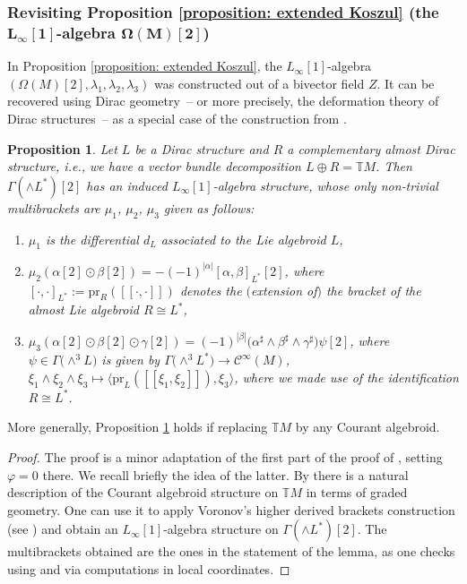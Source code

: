 \documentclass[10pt,a4paper]{amsart}
\numberwithin{equation}{section}
\newtheorem{Proposition}[Theorem]{Proposition}
 { \theoremstyle{definition}
\newtheorem{Definition}[Theorem]{Definition}
\newtheorem{Remark}[Theorem]{Remark} }
\newcommand{\smooth}{\mathcal{C}}
\newcommand{\TT}{\ensuremath{\mathbb T}}
\newcommand{\oo}{[\![}
\newcommand{\cc}{]\!]}
\begin{document}
\subsubsection[Revisiting Proposition \ref{proposition: extended Koszul} (the {$L_\infty[1]$}-algebra {$\Omega(M)[2]$})]{Revisiting Proposition \ref{proposition: extended Koszul} (the $\boldsymbol{L_\infty[1]}$-algebra $\boldsymbol{\Omega(M)[2]}$)}
In Proposition \ref{proposition: extended Koszul}, the $L_\infty[1]$-algebra $(\Omega(M)[2],\lambda_1,\lambda_2,\lambda_3)$ was constructed out of a bivector field $Z$. It can be recovered using Dirac geometry~-- or more precisely, the deformation theory of Dirac structures~-- as a special case of the construction from \cite[Section~2.2]{FZgeo}.

\begin{Proposition}\label{lem:2.6first} Let $L$ be a Dirac structure and $R$ a complementary almost Dirac structure, i.e., we have a vector bundle decomposition $L\oplus R=\TT M$. Then $\Gamma(\wedge L^*)[2]$ has an induced $L_{\infty}[1]$-algebra structure, whose only non-trivial multibrackets are $\mu_1$, $\mu_2$, $\mu_3$ given as follows:
\begin{enumerate}\itemsep=0pt
\item[$1)$] $\mu_1$ is the differential $d_L$ associated to the Lie algebroid $L$,
\item[$2)$] $\mu_2(\alpha[2] \odot \beta[2])=-(-1)^{|\alpha|}[\alpha,\beta]_{L^*}[2]$, where $[\cdot,\cdot]_{L^*}:=\mathrm{pr}_{R}(\oo \cdot , \cdot \cc)$ denotes the $($extension of$)$ the bracket of the almost Lie algebroid $R\cong L^*$,
\item[$3)$] $\mu_3(\alpha[2]\odot \beta[2]\odot \gamma[2])=(-1)^{|\beta|} \big(\alpha^\sharp\wedge \beta^\sharp \wedge \gamma^\sharp\big) \psi[2]$, where $\psi\in \Gamma\big({\wedge}^3 L\big)$ is given by $\Gamma\big({\wedge}^3 L^*\big)\to \smooth^\infty(M)$, $\xi_1 \wedge \xi_2\wedge \xi_3 \mapsto \langle \mathrm{pr}_{L}(\oo \xi_1 , \xi_2 \cc), \xi_3\rangle$, where we made use of the identification $R \cong L^*$.
\end{enumerate}
\end{Proposition}

More generally, Proposition \ref{lem:2.6first} holds if replacing $\TT M$ by any Courant algebroid.

\begin{proof}The proof is a minor adaptation of the first part of the proof of \cite[Lemma 2.6]{FZgeo}, setting $\varphi=0$ there. We recall briefly the idea of the latter. By \cite{DimaThesis} there is a natural description of the Courant algebroid structure on $\TT M$ in terms of graded geometry. One can use it to apply Voronov's higher derived brackets construction (see \cite{Voronov1,Voronov2}) and obtain an $L_{\infty}[1]$-algebra structure on $\Gamma(\wedge L^*)[2]$. The multibrackets obtained are the ones in the statement of the lemma, as one checks using \cite{DimaThesis} and via computations in local coordinates.
\end{proof}
\end{document}
